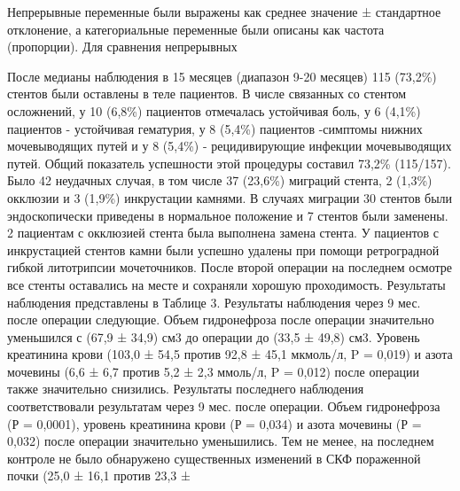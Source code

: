 Непрерывные переменные были выражены как среднее значение ± стандартное отклонение, а категориальные переменные были описаны как частота (пропорции). Для сравнения непрерывных

После медианы наблюдения в 15 месяцев (диапазон 9-20 месяцев) 115 (73,2\%) стентов были оставлены в теле пациентов. В числе связанных со стентом осложнений, у 10 (6,8\%) пациентов отмечалась устойчивая боль, у 6 (4,1\%) пациентов - устойчивая гематурия, у 8 (5,4\%) пациентов -симптомы нижних мочевыводящих путей и у 8 (5,4\%) - рецидивирующие инфекции мочевыводящих путей.
Общий показатель успешности этой процедуры составил 73,2\% (115/157). Было 42 неудачных случая, в том числе 37 (23,6\%) миграций стента, 2 (1,3\%) окклюзии и 3 (1,9\%) инкрустации камнями. В случаях миграции 30 стентов были эндоскопически приведены в нормальное положение и 7 стентов были заменены. 2 пациентам с окклюзией стента была выполнена замена стента. У пациентов с инкрустацией стентов камни были успешно удалены при помощи ретроградной гибкой литотрипсии мочеточников. После второй операции на последнем осмотре все стенты оставались на месте и сохраняли хорошую проходимость.
Результаты наблюдения представлены в Таблице 3. Результаты наблюдения через 9 мес. после операции следующие. Объем гидронефроза после операции значительно уменьшился с (67,9 ± 34,9) см3 до операции до (33,5 ± 49,8) см3. Уровень креатинина крови (103,0 ± 54,5 против 92,8 ± 45,1 мкмоль/л, P = 0,019) и азота мочевины (6,6 ± 6,7 против 5,2 ± 2,3 ммоль/л, P = 0,012) после операции также значительно снизились. Результаты последнего наблюдения соответствовали результатам через 9 мес. после операции. Объем гидронефроза (Р = 0,0001), уровень креатинина крови (Р = 0,034) и азота мочевины (Р = 0,032) после операции значительно уменьшились. Тем не менее, на последнем контроле не было обнаружено существенных изменений в СКФ пораженной почки (25,0 ± 16,1 против 23,3 ± 

